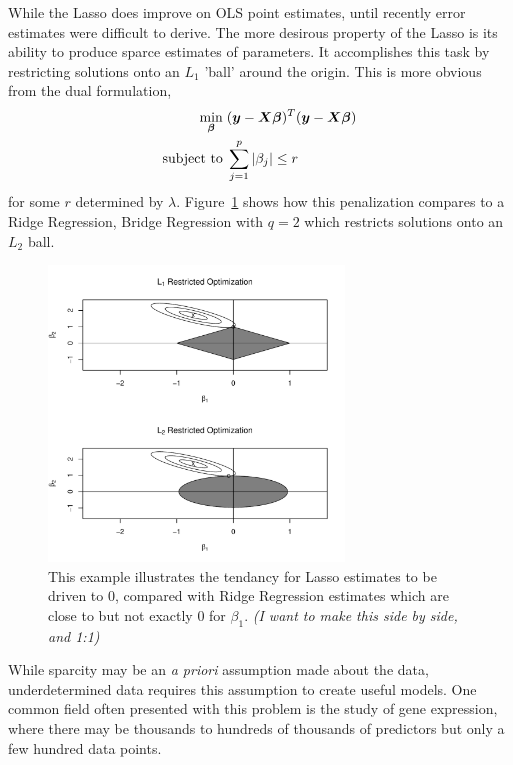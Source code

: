 \documentclass{uwstat572}
\begin{document}
While the Lasso does improve on OLS point estimates, until recently error estimates were difficult to derive. The more desirous property of the Lasso is its ability to produce sparce estimates of parameters. It accomplishes this task by restricting solutions onto an $L_1$ 'ball' around the origin. This is more obvious from the dual formulation, 
\begin{align*}
\min_{\boldsymbol{\beta}}  \hspace{.1cm} &(\boldsymbol{y}-\boldsymbol{X}\boldsymbol{\beta})^T(\boldsymbol{y}-\boldsymbol{X}\boldsymbol{\beta})\\
\text{subject to} \hspace{.1cm}&\sum_{j=1}^p|\beta_j|\leq r
\end{align*}
for some $r$ determined by $\lambda$. Figure~\ref{LassoPlot} shows how this penalization compares to a Ridge Regression, Bridge Regression with $q=2$ which restricts solutions onto an $L_2$ ball.\cite{park2008bayesian}

\begin{figure}\label{LassoPlot}
  \centering
    \includegraphics[width=0.7\textwidth]{LassoPlot.pdf}
  \caption{This example illustrates the tendancy for Lasso estimates to be driven to 0, compared with Ridge Regression estimates which are close to but not exactly 0 for $\beta_1$. \emph{\color{red} (I want to make this side by side, and 1:1)\color{black}}}
\end{figure}

While sparcity may be an \emph{a priori} assumption made about the data, underdetermined data requires this assumption to create useful models. One common field often presented with this problem is the study of gene expression, where there may be thousands to hundreds of thousands of predictors but only a few hundred data points.\cite{seeger2008bayesian}
\end{document}
